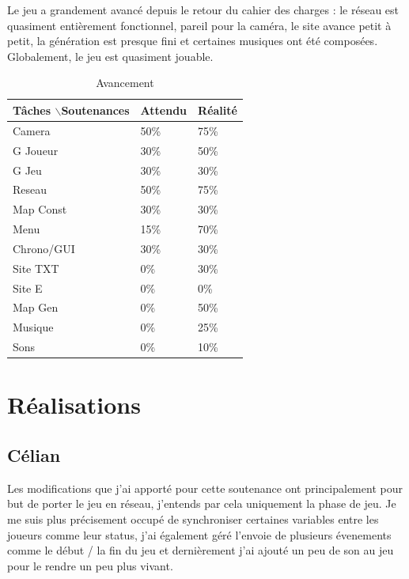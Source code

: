 \documentclass{article}
\begin{document}
Le jeu a grandement avancé depuis le retour du cahier des charges : le réseau est quasiment entièrement fonctionnel, pareil pour la caméra, le site avance petit à petit, la génération est presque fini et certaines musiques ont été composées. Globalement, le jeu est quasiment jouable.
\begin{table}[!h]
\centering
\caption{Avancement}
\begin{tabular}{|l|l|l|}

\hline
Tâches $\backslash$Soutenances & Attendu & Réalité \\ \hline
Camera & 50\% & 75\% \\ \hline
G Joueur & 30\% & 50\% \\ \hline
G Jeu & 30\% & 30\% \\ \hline
Reseau & 50\% & 75\% \\ \hline
Map Const & 30\% & 30\% \\ \hline
Menu & 15\% & 70\% \\ \hline
Chrono/GUI & 30\% & 30\% \\ \hline
Site TXT & 0\% & 30\% \\ \hline
Site E & 0\% & 0\% \\ \hline
Map Gen & 0\% & 50\% \\ \hline
Musique & 0\% & 25\% \\ \hline
Sons & 0\% & 10\% \\ \hline

\end{tabular}
\end{table}
 
\newpage
\section{Réalisations}



\subsection{Célian}

Les modifications que j'ai apporté pour cette soutenance ont principalement pour but de porter le jeu en réseau, j'entends par cela uniquement la phase de jeu. Je me suis plus précisement occupé de synchroniser certaines variables entre les joueurs comme leur status, j'ai également géré l'envoie de plusieurs évenements comme le début / la fin du jeu et dernièrement j'ai ajouté un peu de son au jeu pour le rendre un peu plus vivant.
\end{document}
